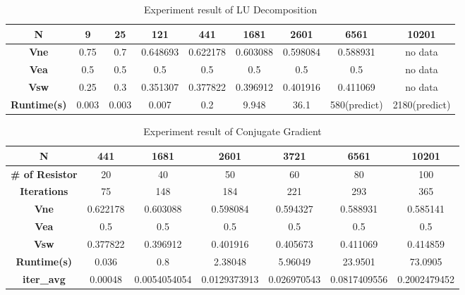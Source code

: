 \documentclass{article}
\begin{document}
\begin{table}[htbp]
	\begin{tabular}{|c|c|c|c|c|c|c|c|c|}
		\hline
		\textbf{N} & 9 & 25 & 121 & 441 & 1681 & 2601 & 6561 & 10201 \\ \hline
		\textbf{Vne} & 0.75 & 0.7 & 0.648693 & 0.622178 & 0.603088 & 0.598084 & 0.588931 & no data \\ \hline
		\textbf{Vea} & 0.5 & 0.5 & 0.5 & 0.5 & 0.5 & 0.5 & 0.5 & no data \\ \hline
		\textbf{Vsw} & 0.25 & 0.3 & 0.351307 & 0.377822 & 0.396912 & 0.401916 & 0.411069 & no data \\ \hline
		\textbf{Runtime(s)} & 0.003 & 0.003 & 0.007 & 0.2 & 9.948 & 36.1 & 580(predict) & 2180(predict) \\ \hline
	\end{tabular}
	\caption{Experiment result of LU Decomposition}
	\label{tab:LU}
\end{table}
\begin{table}[htbp]
    \begin{center}
        \begin{tabular}{|c|c|c|c|c|c|c|}
            \hline
            \textbf{N} & 441 & 1681 & 2601 & 3721 & 6561 & 10201 \\ \hline
            \textbf{\# of Resistor} & 20 & 40 & 50 & 60 & 80 & 100 \\ \hline
            \textbf{Iterations} & 75 & 148 & 184 & 221 & 293 & 365 \\ \hline
            \textbf{Vne} & 0.622178 & 0.603088 & 0.598084 & 0.594327 & 0.588931 & 0.585141 \\ \hline
            \textbf{Vea} & 0.5 & 0.5 & 0.5 & 0.5 & 0.5 & 0.5 \\ \hline
            \textbf{Vsw} & 0.377822 & 0.396912 & 0.401916 & 0.405673 & 0.411069 & 0.414859 \\ \hline
            \textbf{Runtime(s)} & 0.036 & 0.8 & 2.38048 & 5.96049 & 23.9501 & 73.0905 \\ \hline
            \textbf{iter\_avg} & 0.00048 & 0.0054054054 & 0.0129373913 & 0.026970543 & 0.0817409556 & 0.2002479452 \\ \hline
        \end{tabular}
    \end{center}
    \caption{Experiment result of Conjugate Gradient}
    \label{tab:cg}
\end{table}
\end{document}
